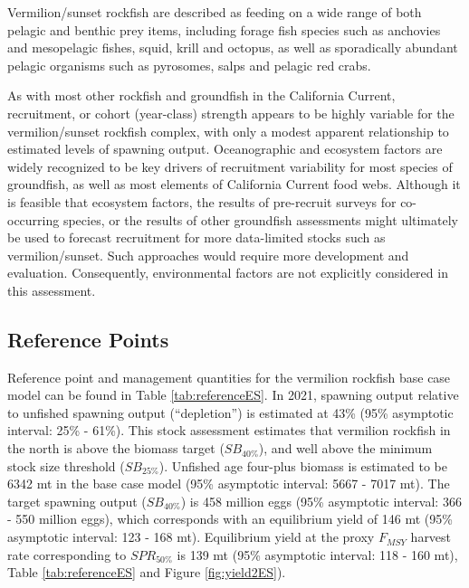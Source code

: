 \documentclass[
  english,
  a4paper,
]{article}
\begin{document}
Vermilion/sunset rockfish are described as feeding on a wide range of both
pelagic and benthic prey items, including forage fish species such as anchovies
and mesopelagic fishes, squid, krill and octopus, as well as sporadically abundant
pelagic organisms such as pyrosomes, salps and pelagic red crabs.

As with most other rockfish and groundfish in the California Current, recruitment,
or cohort (year-class) strength appears to be highly variable for the vermilion/sunset
rockfish complex, with only a modest apparent relationship to estimated levels of spawning output. Oceanographic and ecosystem factors are widely recognized to be key drivers of
recruitment variability for most species of groundfish, as well as most elements
of California Current food webs. Although it is feasible that
ecosystem factors, the results of pre-recruit surveys for co-occurring species,
or the results of other groundfish assessments might ultimately be used to
forecast recruitment for more data-limited stocks such as vermilion/sunset. Such approaches would require more
development and evaluation. Consequently, environmental factors are not
explicitly considered in this assessment.

\FloatBarrier

\hypertarget{reference-points}{%
\subsection*{Reference Points}\label{reference-points}}

Reference point and management quantities for the vermilion rockfish base case
model can be found in Table \ref{tab:referenceES}. In 2021, spawning output
relative to unfished spawning output (``depletion'') is estimated at
43\% (95\% asymptotic interval:
25\% - 61\%).
This stock assessment estimates that vermilion rockfish in the north is above
the biomass target (\(SB_{40\%}\)), and well above the minimum stock size
threshold (\(SB_{25\%}\)). Unfished age four-plus biomass is estimated to be
6342 mt in the base case model (95\% asymptotic interval:
5667 - 7017 mt).
The target spawning output (\(SB_{40\%}\)) is 458 million eggs
(95\% asymptotic interval: 366 - 550 million eggs),
which corresponds with an equilibrium yield of 146 mt
(95\% asymptotic interval: 123 - 168 mt).
Equilibrium yield at the proxy \(F_{MSY}\)
harvest rate corresponding to \(SPR_{50\%}\) is 139 mt
(95\% asymptotic interval: 118 - 160 mt),
Table \ref{tab:referenceES} and Figure \ref{fig:yield2ES}).
\end{document}
